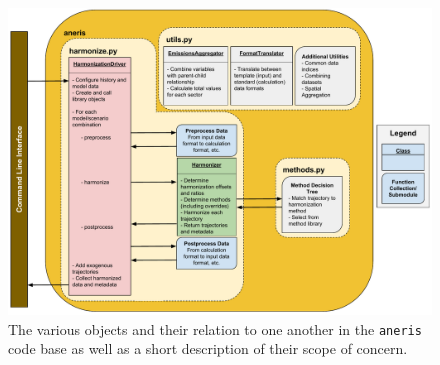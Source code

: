 \documentclass[review]{elsarticle}
\newcommand{\code}[1]{\lstinline[basicstyle=\ttfamily\color{black}]|#1|}
\begin{document}
\begin{figure}
  \begin{center}
    \includegraphics[width=\textwidth]{implementation_schematic.pdf}
    \caption[]{
      \label{fig:software}
      The various objects and their relation to one another in the \code{aneris}
      code base as well as a short description of their scope of concern.  
    }
  \end{center}
\end{figure}
\end{document}
